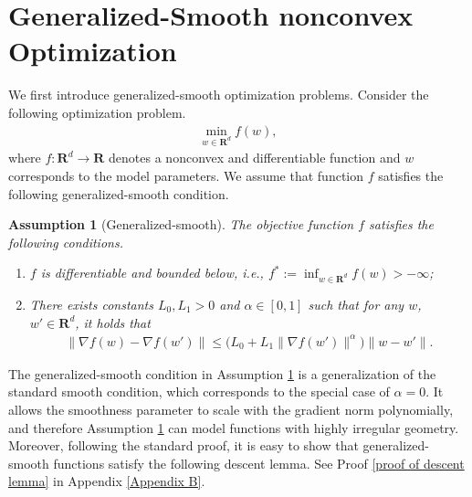\documentclass[10pt]{article} %
\def\eqref#1{equation~\ref{#1}}
\newtheorem{assumption}{Assumption}
\begin{document}
\section{Generalized-Smooth nonconvex Optimization}
We first introduce generalized-smooth optimization problems. Consider the following optimization problem.
\begin{align}
    \min_{w \in \mathbf{R}^d} f(w), 
\end{align}
where $f: \mathbf{R}^d \rightarrow \mathbf{R}$ denotes a nonconvex and differentiable function and $w$ corresponds to the model parameters. We assume that function $f$ satisfies the following generalized-smooth condition. 
\begin{assumption}[Generalized-smooth]\label{assum1}
    The objective function $f$ satisfies the following conditions.
    \begin{enumerate}
        \item $f$ is differentiable and bounded below, i.e., $f^* := \inf_{w\in \mathbf{R}^d} f(w) > -\infty$;
        \item There exists constants $L_0, L_1>0$ and $\alpha\in [0,1]$ such that for any $w$, $w' \in \mathbf{R}^d$, it holds that
        \begin{align}\label{eq: gs}            \big \|\nabla f(w)- \nabla f(w') \big \|
        \leq\big(L_0+L_1 \big \|\nabla f(w') \big \|^{\alpha}\big)\big \|w - w' \big \|.
        \end{align}
    \end{enumerate}
\end{assumption}
The generalized-smooth condition in Assumption \ref{assum1} is a generalization of the standard smooth condition, which corresponds to the special case of $\alpha=0$. It allows the smoothness parameter to scale with the gradient norm polynomially, and therefore Assumption \ref{assum1} can model functions with highly irregular geometry. Moreover, following the standard proof, it is easy to show that generalized-smooth functions satisfy the following descent lemma. See Proof \ref{proof of descent lemma} in Appendix \ref{Appendix B}.
\end{document}
